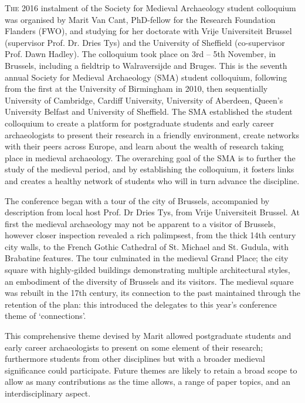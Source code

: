 \documentclass[%
	]{ijsra}
\begin{document}
\IJSRAopening%
\lettrine{T}{he} 2016 instalment of the Society for Medieval Archaeology student colloquium was organised by Marit Van Cant, PhD-fellow for the Research Foundation Flanders (FWO), and studying for her doctorate with Vrije Universiteit Brussel (supervisor Prof. Dr. Dries Tys) and the University of Sheffield (co-supervisor Prof. Dawn Hadley). 
The colloquium took place on 3rd – 5th November, in Brussels, including a fieldtrip to Walraversijde and Bruges. This is the seventh annual Society for Medieval Archaeology (SMA) student colloquium, following from the first at the University of Birmingham in 2010, then sequentially University of Cambridge, Cardiff University, University of Aberdeen, Queen’s University Belfast and University of Sheffield. The SMA established the student colloquium to create a platform for postgraduate students and early career archaeologists to present their research in a friendly environment, create networks with their peers across Europe, and learn about the wealth of research taking place in medieval archaeology. The overarching goal of the SMA is to further the study of the medieval period, and by establishing the colloquium, it fosters links and creates a healthy network of students who will in turn advance the discipline.

The conference began with a tour of the city of Brussels, accompanied by description from local host Prof. Dr Dries Tys, from Vrije Universiteit Brussel. At first the medieval archaeology may not be apparent to a visitor of Brussels, however closer inspection revealed a rich palimpsest, from the thick 14th century city walls, to the French Gothic Cathedral of St. Michael and St. Gudula, with Brabatine features. The tour culminated in the medieval Grand Place; the city square with highly-gilded buildings demonstrating multiple architectural styles, an embodiment of the diversity of Brussels and its visitors. The medieval square was rebuilt in the 17th century, its connection to the past maintained through the retention of the plan: this introduced the delegates to this year’s conference theme of ‘connections’. 

This comprehensive theme devised by Marit allowed postgraduate students and early career archaeologists to present on some element of their research; furthermore students from other disciplines but with a broader medieval significance could participate. Future themes are likely to retain a broad scope to allow as many contributions as the time allows, a range of paper topics, and an interdisciplinary aspect. 
\end{document}

